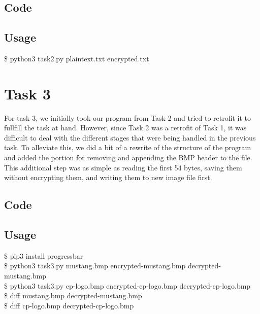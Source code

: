 \documentclass[11pt]{article}
\begin{document}
  \subsection{Code}
    
  \subsection{Usage}
    {\tt\begin{tabbing}                                                                                                                                                                     
       \$ python3 task2.py plaintext.txt encrypted.txt\\
      \end{tabbing}}

\section{Task 3}
  For task 3, we initially took our program from Task 2 and tried to retrofit 
  it to fullfill the task at hand. However, since Task 2 was a retrofit of Task 
  1, it was difficult to deal with the different stages that were being 
  handled in the previous task. To alleviate this, we did a bit of a rewrite of the
  structure of the program and added the portion for removing and appending the 
  BMP header to the file. This additional step was as simple as reading the 
  first 54 bytes, saving them without encrypting them, and writing them to new 
  image file first. 
  \subsection{Code}
    
  \subsection{Usage}
    {\tt\begin{tabbing}                                                                                                                                                                     
      \$ pip3 install progressbar\\
      \$ python3 task3.py mustang.bmp encrypted-mustang.bmp decrypted-mustang.bmp\\
      \$ python3 task3.py cp-logo.bmp encrypted-cp-logo.bmp decrypted-cp-logo.bmp\\
      \$ diff mustang.bmp decrypted-mustang.bmp\\
      \$ diff cp-logo.bmp decrypted-cp-logo.bmp\\
    \end{tabbing}}
\end{document}
